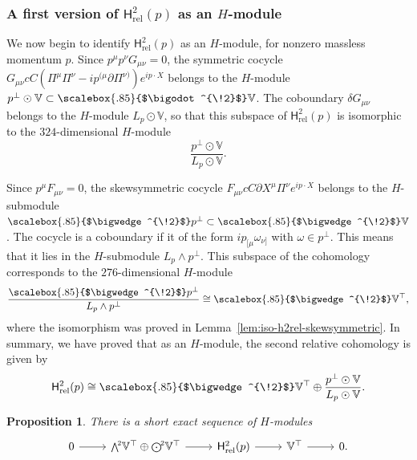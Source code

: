 \documentclass[11pt,reqno,a4paper,final]{amsart}
\newcommand\ext[1]{\scalebox{.85}{$\bigwedge^{\!#1}$}}
\newcommand\sym[1]{\scalebox{.85}{$\bigodot^{\!#1}$}}
\theoremstyle{plain}
\newtheorem{proposition}[lemma]{Proposition}
\theoremstyle{definition}
\renewcommand{\d}{\partial}
\newcommand{\Hrel}{\mathsf{H}_{\mathrm{rel}}}
\newcommand{\VV}{\mathbb{V}}
\newcommand{\1}{\mathbb{1}}
\numberwithin{equation}{section}
\begin{document}
\subsubsection{A first version of $\Hrel^2(p)$ as an $H$-module}
\label{sec:hrel2-as-H-module-v1}

We now begin to identify $\Hrel^2(p)$ as an $H$-module, for
nonzero massless momentum $p$.  Since $p^\mu p^\nu G_{\mu\nu} = 0$,
the symmetric cocycle $G_{\mu\nu} c C (\Pi^\mu \Pi^\nu - i p^{(\mu} \d
\Pi^{\nu)}) e^{i p\cdot X}$ belongs to the $H$-module $p^\perp \odot
\VV \subset \sym{2}\VV$.  The coboundary $\delta G_{\mu\nu}$
belongs to the $H$-module $L_p \odot \VV$, so that this subspace of
$\Hrel^2(p)$ is isomorphic to the $324$-dimensional $H$-module
\begin{equation}
  \label{eq:h2rel-symmetric}
  \dfrac{p^\perp \odot \VV}{L_p \odot \VV}.
\end{equation}

Since $p^\mu F_{\mu\nu} = 0$, the skewsymmetric cocycle $F_{\mu\nu} c C
\d X^\mu \Pi^\nu e^{i p\cdot X}$ belongs to the $H$-submodule
$\ext{2}p^\perp \subset \ext{2} \VV$.  The cocycle is a coboundary if
it of the form $i p_{[\mu} \omega_{\nu]}$ with $\omega \in p^\perp$.
This means that it lies in the $H$-submodule $L_p \wedge p^\perp$.
This subspace of the cohomology corresponds to the $276$-dimensional
$H$-module
\begin{equation}
  \label{eq:h2rel-skewsymmetric}
  \dfrac{\ext{2}p^\perp}{L_p \wedge p^\perp} \cong \ext{2}\VV^\top,
\end{equation}
where the isomorphism was proved in
Lemma~\ref{lem:iso-h2rel-skewsymmetric}.  In summary, we have proved
that as an $H$-module, the second relative cohomology is given by
\begin{equation}
  \label{eq:Hrel2-as-H-mod}
  \Hrel^2(p) \cong \ext{2}\VV^\top \oplus \dfrac{p^\perp \odot \VV}{L_p \odot \VV}.
\end{equation}

\begin{proposition}
  \label{prop:H2rel-SES-duality}
  There is a short exact sequence of $H$-modules
  \begin{equation}
    \label{eq:H2rel-SES-duality}
    \begin{tikzcd}
      0 \arrow[r] & \ext{2}\VV^\top \oplus \sym{2}\VV^\top  \arrow[r] & \Hrel^2(p) \arrow[r] & \VV^\top \arrow[r] & 0.
    \end{tikzcd}
  \end{equation}
\end{proposition}
\end{document}
